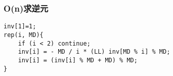 \subsubsection{O(n)求逆元}
\begin{verbatim}
inv[1]=1;
rep(i, MD){
	if (i < 2) continue;
	inv[i] = - MD / i * (LL) inv[MD % i] % MD;
	inv[i] = (inv[i] % MD + MD) % MD;
}
\end{verbatim}
